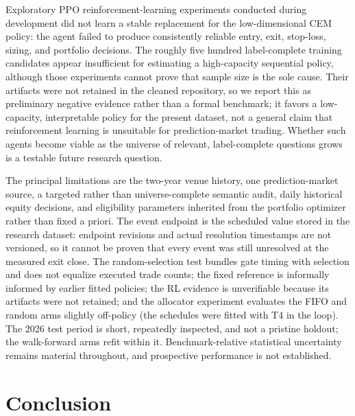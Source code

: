 \documentclass[sigconf,anonymous]{acmart}
\begin{document}
Exploratory PPO reinforcement-learning experiments conducted during development did not learn a stable replacement for the low-dimensional CEM policy: the agent failed to produce consistently reliable entry, exit, stop-loss, sizing, and portfolio decisions. The roughly five hundred label-complete training candidates appear insufficient for estimating a high-capacity sequential policy, although those experiments cannot prove that sample size is the sole cause. Their artifacts were not retained in the cleaned repository, so we report this as preliminary negative evidence rather than a formal benchmark; it favors a low-capacity, interpretable policy for the present dataset, not a general claim that reinforcement learning is unsuitable for prediction-market trading. Whether such agents become viable as the universe of relevant, label-complete questions grows is a testable future research question.

The principal limitations are the two-year venue history, one prediction-market source, a targeted rather than universe-complete semantic audit, daily historical equity decisions, and eligibility parameters inherited from the portfolio optimizer rather than fixed a priori. The event endpoint is the scheduled value stored in the research dataset: endpoint revisions and actual resolution timestamps are not versioned, so it cannot be proven that every event was still unresolved at the measured exit close. The random-selection test bundles gate timing with selection and does not equalize executed trade counts; the fixed reference is informally informed by earlier fitted policies; the RL evidence is unverifiable because its artifacts were not retained; and the allocator experiment evaluates the FIFO and random arms slightly off-policy (the schedules were fitted with T4 in the loop). The 2026 test period is short, repeatedly inspected, and not a pristine holdout; the walk-forward arms refit within it. Benchmark-relative statistical uncertainty remains material throughout, and prospective performance is not established.

\section{Conclusion}
\end{document}
